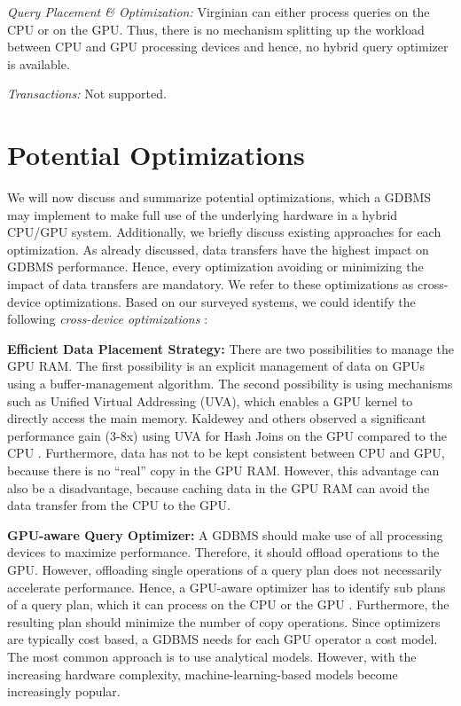 \documentclass[twocolumn]{article}
\begin{document}
\noindent
\textit{Query Placement \& Optimization:} Virginian can either process queries on the CPU or on the GPU. Thus, there is no mechanism splitting up the workload between CPU and GPU processing devices and hence, no hybrid query optimizer is available.

\noindent
\textit{Transactions:} Not supported.

\section{Potential Optimizations}
We will now discuss and summarize potential optimizations, which a GDBMS may implement to make full use of the underlying hardware in a hybrid CPU/GPU system. 
Additionally, we briefly discuss existing approaches for each optimization. 
As already discussed, data transfers have the highest impact on GDBMS performance. 
Hence, every optimization avoiding or minimizing the impact of data transfers are mandatory. 
We refer to these optimizations as cross-device optimizations. 
Based on our surveyed systems, we could identify the following \textit{cross-device optimizations} :

\noindent
\textbf{Efficient Data Placement Strategy:} 
There are two possibilities to manage the GPU RAM. The first possibility is an explicit management of data on GPUs using a buffer-management algorithm. The second possibility is using mechanisms such as Unified Virtual Addressing (UVA), which enables a GPU kernel to directly access the main memory. 
Kaldewey and others observed a significant performance gain (3-8x) using UVA for Hash Joins on the GPU compared to the CPU \cite{Kaldewey:2012}. Furthermore, data has not to be kept consistent between CPU and GPU, because there is no “real” copy in the GPU RAM. However, this advantage can also be a disadvantage, because caching data in the GPU RAM can avoid the data transfer from the CPU to the GPU.

\noindent
\textbf{GPU-aware Query Optimizer:} 
A GDBMS should make use of all processing devices to maximize performance. Therefore, it should offload operations to the GPU. However, offloading single operations of a query plan does not necessarily accelerate performance. 
Hence, a GPU-aware optimizer has to identify sub plans of a query plan, which it can process on the CPU or the GPU \cite{He:2009}. Furthermore, the resulting plan should minimize the number of copy operations. 
Since optimizers are typically cost based, a GDBMS needs for each GPU operator a cost model. The most common approach is to use analytical models.
However, with the increasing hardware complexity, machine-learning-based models become increasingly popular.
\end{document}
